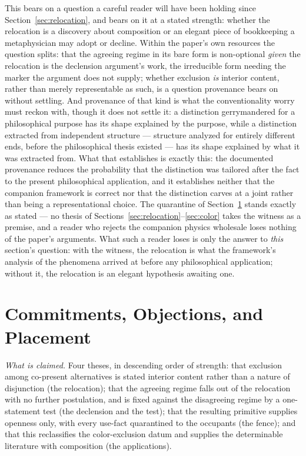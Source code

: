\documentclass[11pt]{article}
\begin{document}
This bears on a question a careful reader will have been holding since Section~\ref{sec:relocation}, and bears on it at a stated strength: whether the relocation is a discovery about composition or an elegant piece of bookkeeping a metaphysician may adopt or decline. Within the paper's own resources the question splits: that the agreeing regime in its bare form is non-optional \emph{given} the relocation is the declension argument's work, the irreducible form needing the marker the argument does not supply; whether exclusion \emph{is} interior content, rather than merely representable as such, is a question provenance bears on without settling. And provenance of that kind is what the conventionality worry must reckon with, though it does not settle it: a distinction gerrymandered for a philosophical purpose has its shape explained by the purpose, while a distinction extracted from independent structure --- structure analyzed for entirely different ends, before the philosophical thesis existed --- has its shape explained by what it was extracted from. What that establishes is exactly this: the documented provenance reduces the probability that the distinction was tailored after the fact to the present philosophical application, and it establishes neither that the companion framework is correct nor that the distinction carves at a joint rather than being a representational choice. The quarantine of Section~\ref{sec:discussion} stands exactly as stated --- no thesis of Sections~\ref{sec:relocation}--\ref{sec:color} takes the witness as a premise, and a reader who rejects the companion physics wholesale loses nothing of the paper's arguments. What such a reader loses is only the answer to \emph{this} section's question: with the witness, the relocation is what the framework's analysis of the phenomena arrived at before any philosophical application; without it, the relocation is an elegant hypothesis awaiting one.

\section{Commitments, Objections, and Placement}\label{sec:discussion}
\emph{What is claimed.} Four theses, in descending order of strength: that exclusion among co-present alternatives is stated interior content rather than a nature of disjunction (the relocation); that the agreeing regime falls out of the relocation with no further postulation, and is fixed against the disagreeing regime by a one-statement test (the declension and the test); that the resulting primitive supplies openness only, with every use-fact quarantined to the occupants (the fence); and that this reclassifies the color-exclusion datum and supplies the determinable literature with composition (the applications).
\end{document}
